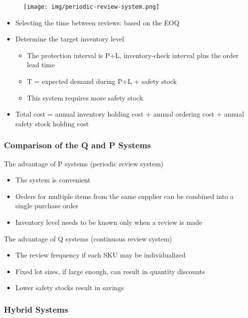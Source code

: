 \documentclass{article}
\begin{document}
\begin{figure}[H]
	\centering
	\texttt{[image: img/periodic-review-system.png]}
\end{figure}

\begin{itemize}
	\item Selecting the time between reviews: based on the EOQ
	\item Determine the target inventory level
	      \begin{itemize}
		      \item The protection interval is P+L, inventory-check interval plus the order lead time
		      \item T = expected demand during P+L + safety stock
		      \item This system requires more safety stock
	      \end{itemize}
	\item Total cost = annual inventory holding cost + annual ordering cost + annual safety stock holding cost
\end{itemize}

\subsubsection{Comparison of the Q and P Systems}

The advantage of P systems (periodic review system)
\begin{itemize}
	\item The system is convenient
	\item Orders for multiple items from the same supplier can be combined into a single purchase order
	\item Inventory level needs to be known only when a review is made
\end{itemize}

The advantage of Q systems (continuous review system)
\begin{itemize}
	\item The review frequency if each SKU may be individualized
	\item Fixed lot sizes, if large enough, can result in quantity discounts
	\item Lower safety stocks result in savings
\end{itemize}

\subsubsection{Hybrid Systems}
\end{document}
